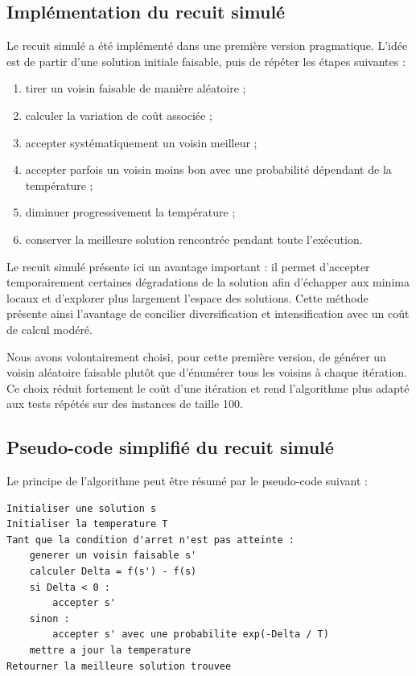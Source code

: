 \documentclass[11pt,a4paper]{article}
\begin{document}
\subsection{Implémentation du recuit simulé}
Le recuit simulé a été implémenté dans une première version pragmatique. L'idée est de partir d'une solution initiale faisable, puis de répéter les étapes suivantes :
\begin{enumerate}[label=\arabic*.]
    \item tirer un voisin faisable de manière aléatoire ;
    \item calculer la variation de coût associée ;
    \item accepter systématiquement un voisin meilleur ;
    \item accepter parfois un voisin moins bon avec une probabilité dépendant de la température ;
    \item diminuer progressivement la température ;
    \item conserver la meilleure solution rencontrée pendant toute l'exécution.
\end{enumerate}

Le recuit simulé présente ici un avantage important : il permet d'accepter temporairement certaines dégradations de la solution afin d'échapper aux minima locaux et d'explorer plus largement l'espace des solutions. Cette méthode présente ainsi l'avantage de concilier diversification et intensification avec un coût de calcul modéré.

Nous avons volontairement choisi, pour cette première version, de générer un voisin aléatoire faisable plutôt que d'énumérer tous les voisins à chaque itération. Ce choix réduit fortement le coût d'une itération et rend l'algorithme plus adapté aux tests répétés sur des instances de taille 100.

\subsection{Pseudo-code simplifié du recuit simulé}
Le principe de l'algorithme peut être résumé par le pseudo-code suivant :

\begin{lstlisting}
Initialiser une solution s
Initialiser la temperature T
Tant que la condition d'arret n'est pas atteinte :
    generer un voisin faisable s'
    calculer Delta = f(s') - f(s)
    si Delta < 0 :
        accepter s'
    sinon :
        accepter s' avec une probabilite exp(-Delta / T)
    mettre a jour la temperature
Retourner la meilleure solution trouvee
\end{lstlisting}
\end{document}
